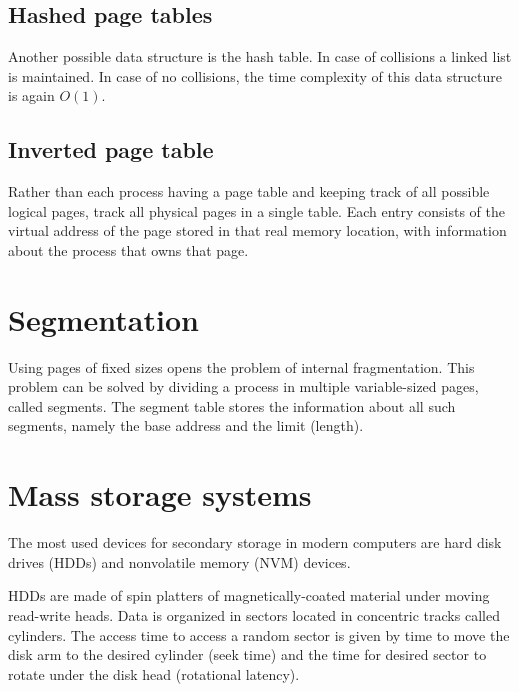 
\subsection{Hashed page tables}
Another possible data structure is the hash table. In case of collisions a linked list is maintained. In case of no collisions, the time complexity of this data structure is again $O(1)$.


\subsection{Inverted page table}
Rather than each process having a page table and keeping track of all possible logical pages, track all physical pages in a single table. Each entry consists of the virtual address of the page stored in that real memory location, with information about the process that owns that page.

\section{Segmentation}
Using pages of fixed sizes opens the problem of internal fragmentation. This problem can be solved by dividing a process in multiple variable-sized pages, called segments. The segment table stores the information about all such segments, namely the base address and the limit (length).


\section{Mass storage systems}
The most used devices for secondary storage in modern computers are hard disk drives (HDDs) and nonvolatile memory (NVM) devices.

HDDs are made of spin platters of magnetically-coated material under moving read-write heads. Data is organized in sectors located in concentric tracks called cylinders. The access time to access a random sector is given by time to move the disk arm to the desired cylinder (seek time) and the time for desired sector to rotate under the disk head (rotational latency).


